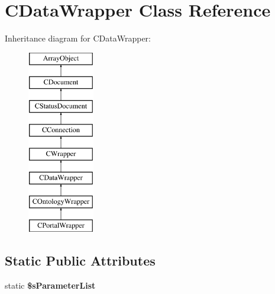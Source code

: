 \hypertarget{class_c_data_wrapper}{\section{C\-Data\-Wrapper Class Reference}
\label{class_c_data_wrapper}
}
Inheritance diagram for C\-Data\-Wrapper\-:\begin{figure}[H]
\begin{center}
\leavevmode
\includegraphics[height=8.000000cm]{class_c_data_wrapper}
\end{center}
\end{figure}
\subsection*{Static Public Attributes}
\begin{DoxyCompactItemize}
\item 
static {\bfseries \$s\-Parameter\-List}
\end{DoxyCompactItemize}
